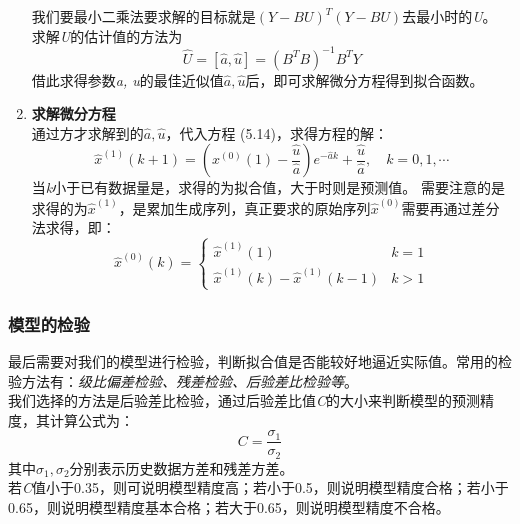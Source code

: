\documentclass[a4paper, 12pt]{article}
\numberwithin{equation}{section}
\begin{document}
\begin{enumerate}
                            我们要最小二乘法要求解的目标就是$ (Y - BU)^{T}(Y - BU) $去最小时的\textit{U}。
                            求解\textit{U}的估计值的方法为
                            \[ \hat{U} = [\hat{a}, \hat{u}] = (B^{T}B)^{-1}B^{T}Y \]
                            借此求得参数\textit{a, u}的最佳近似值$ \hat{a}, \hat{u} $后，即可求解微分方程得到拟合函数。


                        \item \textbf{求解微分方程} \\
                            通过方才求解到的$ \hat{a}, \hat{u} $，代入方程 (5.14)，求得方程的解：
                            \begin{equation}
                                \hat{x}^{(1)} (k + 1) = (x^{(0)}(1) - \frac{\hat{u}}{\hat{a}})e^{-\hat{a}k} + \frac{\hat{u}}{\hat{a}}, \quad k = 0, 1, \cdots
                            \end{equation}
                            当\textit{k}小于已有数据量是，求得的为拟合值，大于时则是预测值。
                            需要注意的是求得的为$ \hat{x}^{(1)} $，是累加生成序列，真正要求的原始序列$ \hat{x}^{(0)} $需要再通过差分法求得，即：
                            \begin{equation}
                                \hat{x}^{(0)}(k) =
                                \begin{cases}
                                    \hat{x}^{(1)}(1) & k = 1 \\
                                    \hat{x}^{(1)}(k) - \hat{x}^{(1)}(k - 1) & k > 1
                                \end{cases}
                            \end{equation}
                    \end{enumerate}


                \subsubsection{模型的检验}
                    最后需要对我们的模型进行检验，判断拟合值是否能较好地逼近实际值。常用的检验方法有：\textit{级比偏差检验、残差检验、后验差比检验等}。\\
                    我们选择的方法是后验差比检验，通过后验差比值\textit{C}的大小来判断模型的预测精度，其计算公式为：
                    \begin{equation}
                        C = \frac{\sigma _{1}}{\sigma _{2}}
                    \end{equation}
                    其中$ \sigma _{1}, \sigma _{2} $分别表示历史数据方差和残差方差。 \\
                    若\textit{C}值小于0.35，则可说明模型精度高；若小于0.5，则说明模型精度合格；若小于0.65，则说明模型精度基本合格；若大于0.65，则说明模型精度不合格。
\end{document}
